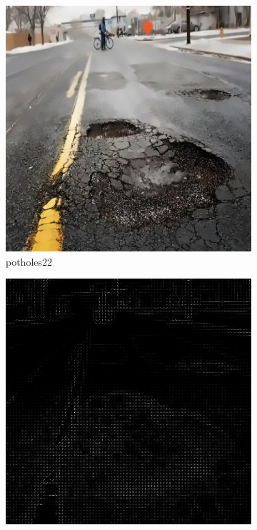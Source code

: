 \documentclass[a4paper, 10pt]{article}
\begin{document}
\begin{figure}[htbp]
		\begin{subfigure}{0.24\textwidth}
			\includegraphics[width=\linewidth]{picture/alldata/potholes22}
			\caption{potholes22}
			\label{fig: potholes22}	
		\end{subfigure}
		\begin{subfigure}{0.24\textwidth}
			\includegraphics[width=\linewidth]{picture/alldata_hog/potholes22}

\end{subfigure}
\end{figure}
\end{document}
